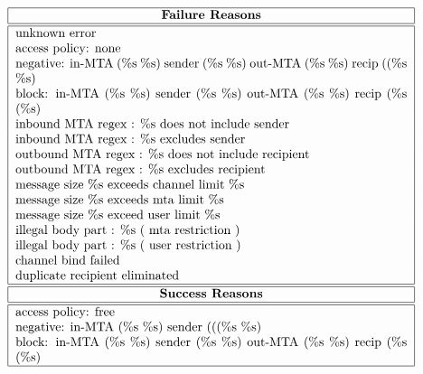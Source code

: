 \[\begin{tabular}{|p{0.9\textwidth}|}
\hline
	\multicolumn{1}{|c|}{\bf Failure Reasons} \\
\hline\hline
	unknown error\\
	access policy: none \\
	negative: in-MTA (\%s \%s) sender (\%s \%s) out-MTA (\%s \%s) recip
			 ((\%s \%s) \\
	block: in-MTA (\%s \%s) sender (\%s \%s) out-MTA (\%s \%s) recip (\%s
		      (\%s) \\
	inbound MTA regex : \%s does not include sender \\
	inbound MTA regex : \%s excludes sender \\
	outbound MTA regex : \%s does not include recipient \\
	outbound MTA regex : \%s excludes recipient \\
	message size \%s exceeds channel limit \%s \\
	message size \%s exceeds mta limit \%s \\
	message size \%s exceed user limit \%s \\
	illegal body part : \%s ( mta restriction ) \\
	illegal body part : \%s ( user restriction ) \\
	channel bind failed \\
	duplicate recipient eliminated \\
\hline\hline
	\multicolumn{1}{|c|}{\bf  Success Reasons} \\
\hline\hline
	access policy: free\\
	negative: in-MTA (\%s \%s) sender (%
			 ((\%s \%s) \\
	block: in-MTA (\%s \%s) sender (\%s \%s) out-MTA (\%s \%s) recip (\%s
		      (\%s) \\ \hline
\end{tabular}\]

